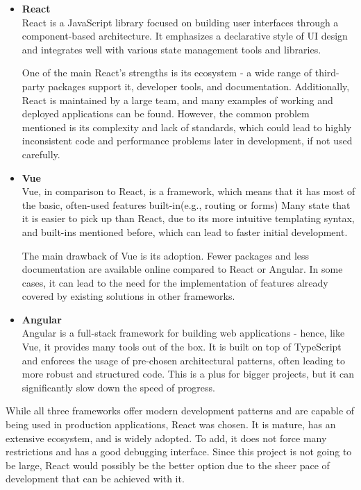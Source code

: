 \begin{itemize}
    \item \textbf{React} \\
    React is a JavaScript library focused on building user interfaces through a component-based architecture.\cite{react}
    It emphasizes a declarative style of UI design and integrates well with various state management tools and libraries.

    One of the main React’s strengths is its ecosystem - a wide range of third-party packages support it,
    developer tools, and documentation.
    Additionally, React is maintained by a large team, and many examples of working and deployed applications can be found.
    However, the common problem mentioned is its complexity and lack of standards, which could lead to highly inconsistent
    code and performance problems later in development, if not used carefully.

    \item \textbf{Vue} \\
    Vue, in comparison to React, is a framework, which means that it has most of the basic, often-used features built-in(e.g., routing or forms)\cite{vue}
    Many state that it is easier to pick up than React, due to its more intuitive templating syntax, and built-ins mentioned before,
    which can lead to faster initial development.

    The main drawback of Vue is its adoption.\cite{frameworkdata}
    Fewer packages and less documentation are available online compared to React or Angular.
    In some cases, it can lead to the need for the implementation of features already covered by existing solutions in other frameworks.

    \item \textbf{Angular} \\
    Angular is a full-stack framework for building web applications - hence, like Vue, it provides many tools out of the box.
    It is built on top of TypeScript and enforces the usage of pre-chosen architectural patterns, often leading to
    more robust and structured code. This is a plus for bigger projects, but it can significantly slow down the speed of
    progress.

\end{itemize}

While all three frameworks offer modern development patterns and are capable of being used in production applications,
React was chosen. It is mature, has an extensive ecosystem, and is widely adopted. To add, it does not force many
restrictions and has a good debugging interface. Since this project is not going to be large, React would possibly be the
better option due to the sheer pace of development that can be achieved with it.

